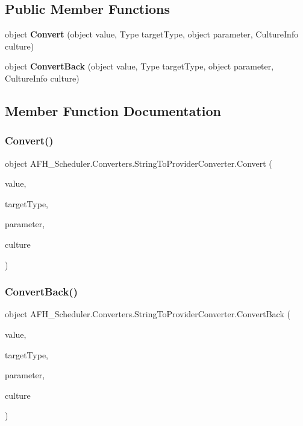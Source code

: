 \subsection*{Public Member Functions}
\begin{DoxyCompactItemize}
\item 
object \textbf{ Convert} (object value, Type target\+Type, object parameter, Culture\+Info culture)
\item 
object \textbf{ Convert\+Back} (object value, Type target\+Type, object parameter, Culture\+Info culture)
\end{DoxyCompactItemize}


\subsection{Member Function Documentation}
\mbox{\label{class_a_f_h___scheduler_1_1_converters_1_1_string_to_provider_converter_a57bf3f9237c6694ea6f28a10084f72ab}} 
\subsubsection{Convert()}
{\footnotesize\ttfamily object A\+F\+H\+\_\+\+Scheduler.\+Converters.\+String\+To\+Provider\+Converter.\+Convert (\begin{DoxyParamCaption}\item[{object}]{value,  }\item[{Type}]{target\+Type,  }\item[{object}]{parameter,  }\item[{Culture\+Info}]{culture }\end{DoxyParamCaption})}

\mbox{\label{class_a_f_h___scheduler_1_1_converters_1_1_string_to_provider_converter_a95942bedf64d17320a7b9dded478ad99}} 
\subsubsection{ConvertBack()}
{\footnotesize\ttfamily object A\+F\+H\+\_\+\+Scheduler.\+Converters.\+String\+To\+Provider\+Converter.\+Convert\+Back (\begin{DoxyParamCaption}\item[{object}]{value,  }\item[{Type}]{target\+Type,  }\item[{object}]{parameter,  }\item[{Culture\+Info}]{culture }\end{DoxyParamCaption})}



